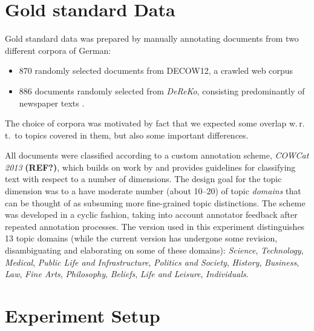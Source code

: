 \documentclass[11pt]{article}
\begin{document}
\section{Gold standard Data}
\label{sec:goldstandard}





Gold standard data was prepared by manually annotating documents from two different corpora of German: 
\begin{itemize}
\item 870 randomly selected documents from DECOW12, a crawled web corpus \cite{SchaeferBildhauer2012a,Schaefer2015b}
\item  886 documents randomly selected from \textit{DeReKo}, consisting predominantly of newspaper texts \cite{KupietzEa2010}. 
\end{itemize}
The choice of corpora was motivated by fact that we expected some overlap w.\,r.\,t.\ to topics covered in them, but also some important differences. 

 All documents were classified according to a custom annotation scheme, \textit{COWCat 2013} \textbf{(REF?)}, which builds on work by \cite{Sharoff2006} and provides guidelines for classifying text with respect to a number of dimensions. The design goal for the topic dimension was to a have moderate number (about 10--20) of topic \textit{domains} that can be thought of as subsuming more fine-grained topic distinctions. 
 The scheme was developed in a cyclic fashion, taking into account annotator feedback after repeated annotation processes. The version used in this experiment distinguishes 13 topic domains (while the current version has undergone some revision, disambiguating and elaborating on some of these domains): \textit{Science}, \textit{Technology}, \textit{Medical}, \textit{Public Life and Infrastructure}, \textit{Politics and Society}, \textit{History}, \textit{Business}, \textit{Law}, \textit{Fine Arts},  \textit{Philosophy}, \textit{Beliefs},  \textit{Life and Leisure}, \textit{Individuals}.


\section{Experiment Setup}
\label{sec:experiment}
\end{document}
